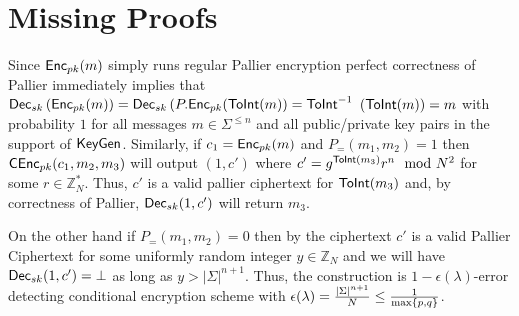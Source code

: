 \section{Missing Proofs}

\begin{remindertheorem} {}
\ThmEqCorrectness
\end{remindertheorem}
\begin{proofof}
{}
 Since ${\mathsf{Enc}}_{pk}(m)$ simply runs regular Pallier encryption perfect correctness of Pallier immediately implies that 
 ${\mathsf{Dec}}_{sk}\left( {\mathsf{Enc}}_{pk}(m)\right) =  {\mathsf{Dec}}_{sk}\left(P.{\mathsf{Enc}}_{pk}({\mathsf{ToInt}}(m) \right)= {\mathsf{ToInt}^{-1}}$ $({\mathsf{ToInt}}(m)) = m$ with probability $1$ for all messages $m \in \Sigma^{\leq n}$ and all public/private key pairs in the support of ${\mathsf{KeyGen}}$. Similarly, if $c_1={\mathsf{Enc}}_{pk}(m)$ and $P_{=}(m_1,m_2) = 1$ then ${\mathsf{C}}{\mathsf{Enc}}_{pk}(c_1,m_2,m_3)$ will output $(1,c')$ where $c' = g^{{\mathsf{ToInt}}{(m_3)}} r^n \mod{N^2}$ for some $r \in \mathbb{Z}_N^*$. Thus, $c'$ is a valid pallier ciphertext for ${\mathsf{ToInt}}{(m_3)}$ and, by correctness of Pallier, ${\mathsf{Dec}}_{sk}(1,c')$ will return $m_3$. 

 On the other hand if $P_{=}(m_1,m_2) = 0$ then by  the ciphertext $c'$ is a valid Pallier Ciphertext for some uniformly random integer $y \in \mathbb{Z}_N$ and we will have ${\mathsf{Dec}}_{sk}(1,c') = \bot$ as long as $y > |\Sigma|^{n+1}$. Thus, the construction is $1-\epsilon(\lambda)$-error detecting conditional encryption scheme with $\epsilon(\lambda) = \frac{|\Sigma|^{n+1}}{N} \leq \frac{1}{\max\{p,q\}}$.
\end{proofof}



